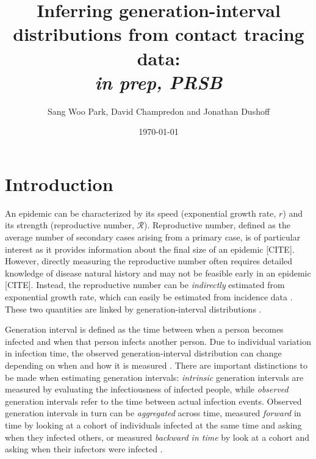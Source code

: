 \documentclass[12pt]{article}
\title{Inferring generation-interval distributions from contact tracing data: \\ \emph{in prep, PRSB}}
\author{Sang Woo Park, David Champredon and Jonathan Dushoff}
\date{\today}
\newcommand{\RR}{\ensuremath{{\mathcal R}}}
\begin{document}
\maketitle

\section{Introduction}

An epidemic can be characterized by its speed (exponential growth rate, $r$) and its strength (reproductive number, \RR).
Reproductive number, defined as the average number of secondary cases arising from a primary case, is of particular interest as it provides information about the final size of an epidemic [CITE].
However, directly measuring the reproductive number often requires detailed knowledge of disease natural history and may not be feasible early in an epidemic [CITE].
Instead, the reproductive number can be \emph{indirectly} estimated from exponential growth rate, which can easily be estimated from incidence data \citep{mills2004transmissibility, nishiura2009transmission, ma2014estimating}.
These two quantities are linked by generation-interval distributions \citep{wallinga2007generation}.

Generation interval is defined as the time between when a person becomes infected and when that person infects another person.
Due to individual variation in infection time, the observed generation-interval distribution can change depending on when and how it is measured \citep{svensson2007note, kenah2008generation, nishiura2010time}.
There are important distinctions to be made when estimating generation intervals: \emph{intrinsic} generation intervals are measured by evaluating the infectiousness of infected people,
while \emph{observed} generation intervals refer to the time between actual infection events.
Observed generation intervals in turn can be \emph{aggregated} across time, measured \emph{forward} in time by looking at a cohort of individuals infected at the same time and asking when they infected others, or measured \emph{backward in time} by look at a cohort and asking when their infectors were infected \citep{champredon2015intrinsic}.
\end{document}
